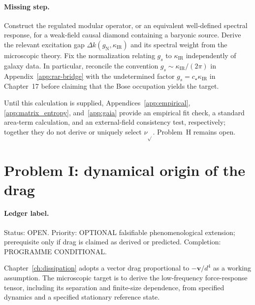\paragraph{Missing step.}
Construct the regulated modular operator, or an equivalent
well-defined spectral response, for a weak-field causal diamond
containing a baryonic source. Derive the relevant excitation gap
\(\Delta k(g_{\mathrm N},\kappa_{\mathrm{IR}})\) and its spectral
weight from the microscopic theory. Fix the normalization relating
\(g_s\) to \(\kappa_{\mathrm{IR}}\) independently of galaxy data.
In particular, reconcile the convention
\(g_s\sim\kappa_{\mathrm{IR}}/(2\pi)\) in
Appendix~\ref{app:rar-bridge} with the undetermined factor
\(g_s=c_\star\kappa_{\mathrm{IR}}\) in Chapter~17 before claiming
that the Bose occupation yields the target.

Until this calculation is supplied, Appendices~\ref{app:empirical},
\ref{app:matrix_entropy}, and~\ref{app:gaia} provide an empirical fit
check, a standard area-term calculation, and an external-field
consistency test, respectively; together they do not derive or
uniquely select \(\nu_{\sqrt{}}\). Problem~H remains open.

\section{Problem I: dynamical origin of the drag}
\label{sec:status-I}

\paragraph{Ledger label.}
Status: OPEN. Priority: OPTIONAL falsifiable phenomenological
extension; prerequisite only if drag is claimed as derived or predicted.
Completion: PROGRAMME CONDITIONAL.

Chapter~\ref{ch:dissipation} adopts a vector drag proportional to
\(-\mathbf v/d^4\) as a working assumption. The microscopic target
is to derive the low-frequency force-response tensor, including its
separation and finite-size dependence, from specified dynamics and
a specified stationary reference state.

